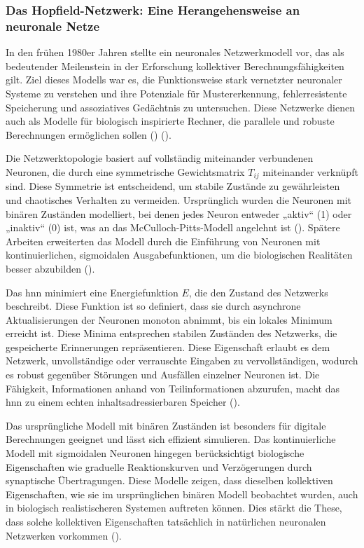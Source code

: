 \subsubsection{Das Hopfield-Netzwerk: Eine Herangehensweise an neuronale Netze}
\label{chap:Das Hopfield-Netzwerk: Eine Herangehensweise an neuronale Netze}

In den frühen 1980er Jahren stellte \citeauthor{Hopfield1982} ein neuronales Netzwerkmodell vor, das als bedeutender Meilenstein in der Erforschung kollektiver Berechnungsfähigkeiten gilt. Ziel dieses Modells war es, die Funktionsweise stark vernetzter neuronaler Systeme zu verstehen und ihre Potenziale für Mustererkennung, fehlerresistente Speicherung und assoziatives Gedächtnis zu untersuchen. Diese Netzwerke dienen auch als Modelle für biologisch inspirierte Rechner, die parallele und robuste Berechnungen ermöglichen sollen (\cite[vgl. S. 2554]{Hopfield1982}) (\cite[vgl. S. 3088]{Hopfield1984}).

Die Netzwerktopologie basiert auf vollständig miteinander verbundenen Neuronen, die durch eine symmetrische Gewichtsmatrix \(T_{ij}\) miteinander verknüpft sind. Diese Symmetrie ist entscheidend, um stabile Zustände zu gewährleisten und chaotisches Verhalten zu vermeiden. Ursprünglich wurden die Neuronen mit binären Zuständen modelliert, bei denen jedes Neuron entweder „aktiv“ (1) oder „inaktiv“ (0) ist, was an das McCulloch-Pitts-Modell angelehnt ist (\cite[vgl. S. 2555]{Hopfield1982}). Spätere Arbeiten erweiterten das Modell durch die Einführung von Neuronen mit kontinuierlichen, sigmoidalen Ausgabefunktionen, um die biologischen Realitäten besser abzubilden (\cite[vgl. S. 3088]{Hopfield1984}).

Das \ac{hnn} minimiert eine Energiefunktion \(E\), die den Zustand des Netzwerks beschreibt. Diese Funktion ist so definiert, dass sie durch asynchrone Aktualisierungen der Neuronen monoton abnimmt, bis ein lokales Minimum erreicht ist. Diese Minima entsprechen stabilen Zuständen des Netzwerks, die gespeicherte Erinnerungen repräsentieren. Diese Eigenschaft erlaubt es dem Netzwerk, unvollständige oder verrauschte Eingaben zu vervollständigen, wodurch es robust gegenüber Störungen und Ausfällen einzelner Neuronen ist. Die Fähigkeit, Informationen anhand von Teilinformationen abzurufen, macht das \ac{hnn} zu einem echten inhaltsadressierbaren Speicher (\cite[vgl. S. 2554 f.]{Hopfield1982}).

Das ursprüngliche Modell mit binären Zuständen ist besonders für digitale Berechnungen geeignet und lässt sich effizient simulieren. Das kontinuierliche Modell mit sigmoidalen Neuronen hingegen berücksichtigt biologische Eigenschaften wie graduelle Reaktionskurven und Verzögerungen durch synaptische Übertragungen. Diese Modelle zeigen, dass dieselben kollektiven Eigenschaften, wie sie im ursprünglichen binären Modell beobachtet wurden, auch in biologisch realistischeren Systemen auftreten können. Dies stärkt die These, dass solche kollektiven Eigenschaften tatsächlich in natürlichen neuronalen Netzwerken vorkommen (\cite[vgl. S. 3089]{Hopfield1984}).

